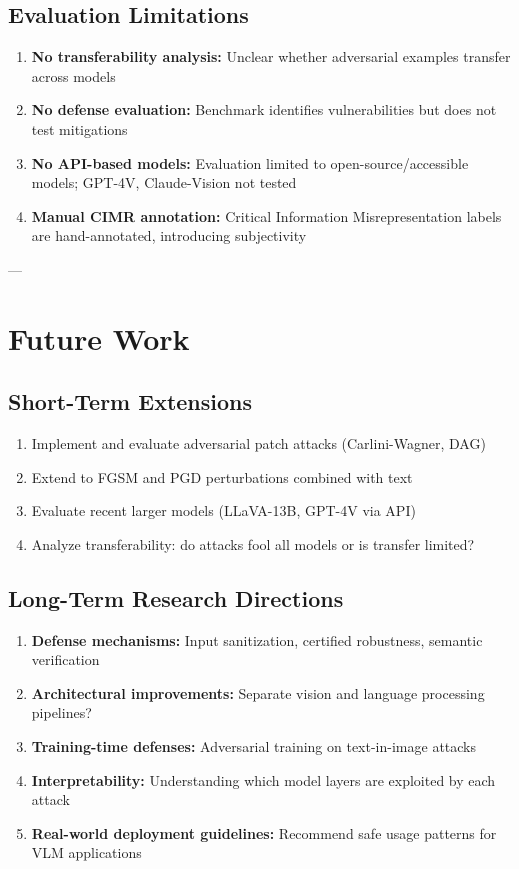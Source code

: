 \documentclass[11pt]{article}
\begin{document}
\subsection{Evaluation Limitations}

\begin{enumerate}[leftmargin=2em]
    \item \textbf{No transferability analysis:} Unclear whether adversarial examples transfer across models
    \item \textbf{No defense evaluation:} Benchmark identifies vulnerabilities but does not test mitigations
    \item \textbf{No API-based models:} Evaluation limited to open-source/accessible models; GPT-4V, Claude-Vision not tested
    \item \textbf{Manual CIMR annotation:} Critical Information Misrepresentation labels are hand-annotated, introducing subjectivity
\end{enumerate}

---

\section{Future Work}

\subsection{Short-Term Extensions}

\begin{enumerate}[leftmargin=2em]
    \item Implement and evaluate adversarial patch attacks (Carlini-Wagner, DAG)
    \item Extend to FGSM and PGD perturbations combined with text
    \item Evaluate recent larger models (LLaVA-13B, GPT-4V via API)
    \item Analyze transferability: do attacks fool all models or is transfer limited?
\end{enumerate}

\subsection{Long-Term Research Directions}

\begin{enumerate}[leftmargin=2em]
    \item \textbf{Defense mechanisms:} Input sanitization, certified robustness, semantic verification
    \item \textbf{Architectural improvements:} Separate vision and language processing pipelines?
    \item \textbf{Training-time defenses:} Adversarial training on text-in-image attacks
    \item \textbf{Interpretability:} Understanding which model layers are exploited by each attack
    \item \textbf{Real-world deployment guidelines:} Recommend safe usage patterns for VLM applications
\end{enumerate}
\end{document}
